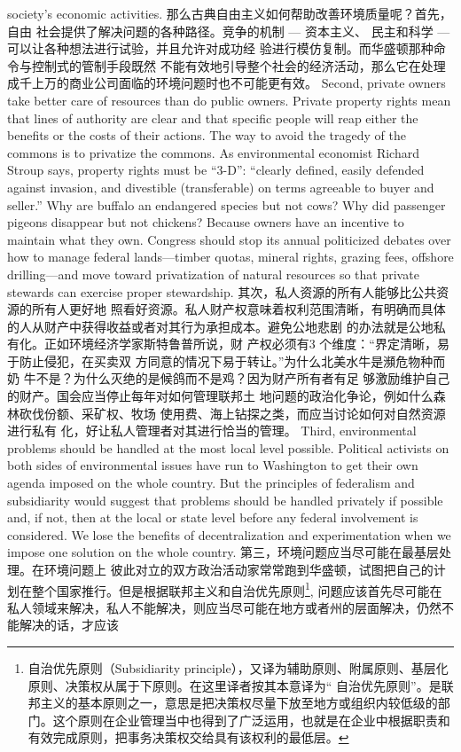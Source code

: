 \begin{paracol}{2}
society's economic activities.
\switchcolumn
那么古典自由主义如何帮助改善环境质量呢？首先，自由
社会提供了解决问题的各种路径。竞争的机制 --- 资本主义、
民主和科学 --- 可以让各种想法进行试验，并且允许对成功经
验进行模仿复制。而华盛顿那种命令与控制式的管制手段既然
不能有效地引导整个社会的经济活动，那么它在处理成千上万的商业公司面临的环境问题时也不可能更有效。
\switchcolumn*
Second, private owners take better care of resources than do
public owners. Private property rights mean that lines of authority are clear and that specific people will reap either the benefits
or the costs of their actions. The way to avoid the tragedy of the
commons is to privatize the commons. As environmental economist Richard Stroup says, property rights must be ``3-D'':
``clearly defined, easily defended against invasion, and divestible
(transferable) on terms agreeable to buyer and seller.'' Why are
buffalo an endangered species but not cows? Why did passenger
pigeons disappear but not chickens? Because owners have an incentive to maintain what they own. Congress should stop its annual politicized debates over how to manage federal lands---timber quotas, mineral rights, grazing fees, offshore drilling---and move toward privatization of natural resources so that private stewards can exercise proper stewardship.
\switchcolumn
其次，私人资源的所有人能够比公共资源的所有人更好地
照看好资源。私人财产权意味着权利范围清晰，有明确而具体
的人从财产中获得收益或者对其行为承担成本。避免公地悲剧
的办法就是公地私有化。正如环境经济学家斯特鲁普所说，财
产权必须有3 个维度：“界定清晰，易于防止侵犯，在买卖双
方同意的情况下易于转让。”为什么北美水牛是瀕危物种而奶
牛不是？为什么灭绝的是候鸽而不是鸡？因为财产所有者有足
够激励维护自己的财产。国会应当停止每年对如何管理联邦土
地问题的政治化争论，例如什么森林砍伐份额、采矿权、牧场
使用费、海上钻探之类，而应当讨论如何对自然资源进行私有
化，好让私人管理者对其进行恰当的管理。
\switchcolumn*
Third, environmental problems should be handled at the
most local level possible. Political activists on both sides of environmental issues have run to Washington to get their own
agenda imposed on the whole country. But the principles of federalism and subsidiarity would suggest that problems should be
handled privately if possible and, if not, then at the local or
state level before any federal involvement is considered. We lose
the benefits of decentralization and experimentation when we
impose one solution on the whole country.
\switchcolumn
第三，环境问题应当尽可能在最基层处理。在环境问题上
彼此对立的双方政治活动家常常跑到华盛顿，试图把自己的计
划在整个国家推行。但是根据联邦主义和自治优先原则\footnote{自治优先原则（Subsidiarity  principle），又译为辅助原则、附属原则、基层化原则、决策权从属于下原则。在这里译者按其本意译为“ 自治优先原则”。是联邦主义的基本原则之一，意思是把决策权尽量下放至地方或组织内较低级的部门。这个原则在企业管理当中也得到了广泛运用，也就是在企业中根据职责和有效完成原则，把事务决策权交给具有该权利的最低层。}, 问题应该首先尽可能在私人领域来解决，私人不能解决，则应当尽可能在地方或者州的层面解决，仍然不能解决的话，才应该

\end{paracol}
